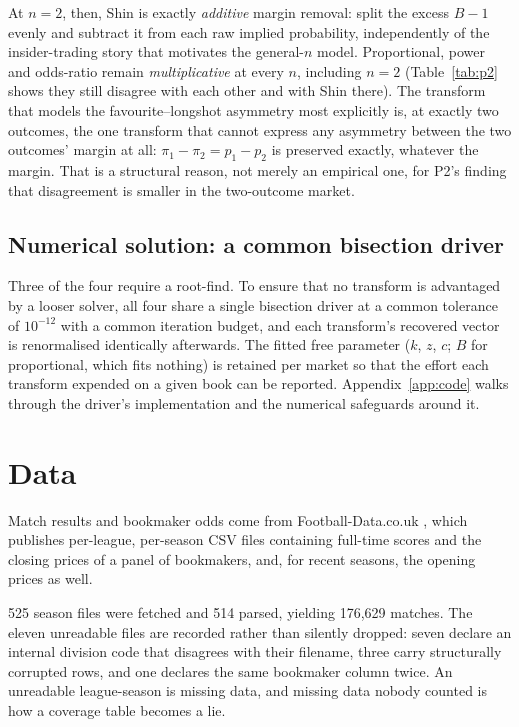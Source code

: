 \documentclass[11pt,a4paper]{article}
\providecommand{\NFilesFetched}{525}
\providecommand{\NFilesRead}{514}
\providecommand{\NMatchesArchive}{176{,}629}
\begin{document}
At $n=2$, then, Shin is exactly \emph{additive} margin removal: split the
excess $B-1$ evenly and subtract it from each raw implied probability,
independently of the insider-trading story that motivates the general-$n$
model. Proportional, power and odds-ratio remain \emph{multiplicative} at
every $n$, including $n=2$ (Table~\ref{tab:p2} shows they still disagree with
each other and with Shin there). The transform that models the
favourite--longshot asymmetry most explicitly is, at exactly two outcomes,
the one transform that cannot express any asymmetry between the two
outcomes' margin at all: $\pi_1 - \pi_2 = p_1 - p_2$ is preserved exactly,
whatever the margin. That is a structural reason, not merely an empirical
one, for P2's finding that disagreement is smaller in the two-outcome market.

\subsection{Numerical solution: a common bisection driver}
\label{sec:numerics}

Three of the four require a root-find. To ensure that no transform is
advantaged by a looser solver, all four share a single bisection driver at a
common tolerance of $10^{-12}$ with a common iteration budget, and each
transform's recovered vector is renormalised identically afterwards. The
fitted free parameter ($k$, $z$, $c$; $B$ for proportional, which fits nothing)
is retained per market so that the effort each transform expended on a given
book can be reported. Appendix~\ref{app:code} walks through the driver's
implementation and the numerical safeguards around it.

\section{Data}
\label{sec:data}

Match results and bookmaker odds come from Football-Data.co.uk
\citep{footballdata}, which publishes per-league, per-season CSV files
containing full-time scores and the closing prices of a panel of
bookmakers, and, for recent seasons, the opening prices as well.

\NFilesFetched{} season files were fetched and \NFilesRead{} parsed, yielding
\NMatchesArchive{} matches. The eleven unreadable files are recorded rather
than silently dropped: seven declare an internal division code that disagrees
with their filename, three carry structurally corrupted rows, and one declares
the same bookmaker column twice. An unreadable league-season is missing data,
and missing data nobody counted is how a coverage table becomes a lie.
\end{document}
